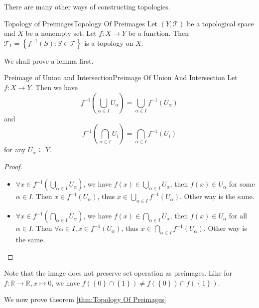 \documentclass[../main.tex]{subfiles}
\begin{document}
There are many other ways of constructing topologies.
\begin{theorem}{Topology of Preimages}{Topology Of Preimages}
Let $(Y,\mathcal{T})$ be a topological space and $X$ be a nonempty set. Let $f:X \rightarrow Y$ be a function. Then $\mathcal{T}_1 = \left\{ f^{-1}(S): S\in \mathcal{T} \right\}$ is a topology on $X$.
\end{theorem}

We shall prove a lemma first.
\begin{lemma}{Preimage of Union and Intersection}{Preimage Of Union And Intersection}
Let $f:X \rightarrow Y$. Then we have
\begin{equation}
	f^{-1}\left(\bigcup_{\alpha\in I} U_{\alpha}\right) = \bigcup_{\alpha\in I} f^{-1}(U_{\alpha})
\end{equation}
and
\begin{equation}
	f^{-1}\left(\bigcap_{\alpha\in I} U_i \right) = \bigcap_{\alpha\in I} f^{-1}(U_i) 
\end{equation}
for any $U_{\alpha} \subseteq Y$.
\end{lemma}
\begin{proof}
\begin{itemize}
	\item $\displaystyle \forall x\in f^{-1}\left(\bigcup_{\alpha\in I} U_{\alpha}\right)$,  we have $\displaystyle f(x) \in \bigcup_{\alpha\in I} U_{\alpha}$, then $f(x)\in U_{\alpha}$ for some $\alpha\in I$. Then $x\in f^{-1}(U_{\alpha})$, thus $\displaystyle x\in \bigcup_{\alpha\in I} f^{-1}(U_{\alpha})$. Other way is the same.
	\item $\displaystyle \forall x\in f^{-1}\left(\bigcap_{\alpha\in I} U_{\alpha}\right)$,  we have $\displaystyle f(x) \in \bigcap_{\alpha\in I} U_{\alpha}$, then $f(x)\in U_{\alpha}$ for all $\alpha\in I$. Then $\forall \alpha\in I, x\in f^{-1}(U_{\alpha})$, thus $\displaystyle x\in \bigcap_{\alpha\in I} f^{-1}(U_{\alpha})$. Other way is the same.
\end{itemize}
\end{proof}

\begin{remark}
Note that the image does not preserve set operation as preimages. Like for $f: \mathbb{R}\rightarrow \mathbb{R}, x \mapsto 0$, we have $f \left(\left\{ 0 \right\}\cap \left\{ 1 \right\}\right) \neq f \left(\left\{ 0 \right\}\right)\cap f \left(\left\{ 1 \right\}\right)$.
\end{remark}

We now prove theorem \ref{thm:Topology Of Preimages}
\end{document}

